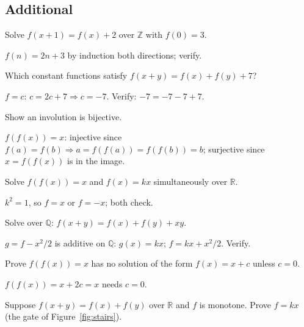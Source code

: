 \subsection*{Additional}
\begin{exercise}[easy]\label{exr:fa1}
Solve $f(x+1)=f(x)+2$ over $\mathbb Z$ with $f(0)=3$.
\end{exercise}
\begin{solution}
$f(n)=2n+3$ by induction both directions; verify.
\end{solution}
\begin{exercise}[easy]\label{exr:fa2}
Which constant functions satisfy $f(x+y)=f(x)+f(y)+7$?
\end{exercise}
\begin{solution}
$f=c$: $c=2c+7 \Rightarrow c=-7$. Verify: $-7=-7-7+7$.
\end{solution}
\begin{exercise}[easy]\label{exr:fa3}
Show an involution is bijective.
\end{exercise}
\begin{solution}
$f(f(x))=x$: injective since $f(a)=f(b)\Rightarrow a=f(f(a))=f(f(b))=b$;
surjective since $x=f(f(x))$ is in the image.
\end{solution}
\begin{exercise}[easy]\label{exr:fa4}
Solve $f(f(x))=x$ and $f(x)=kx$ simultaneously over $\mathbb R$.
\end{exercise}
\begin{solution}
$k^2=1$, so $f=x$ or $f=-x$; both check.
\end{solution}
\begin{exercise}[medium]\label{exr:fa5}
Solve over $\mathbb Q$: $f(x+y)=f(x)+f(y)+xy$.
\end{exercise}
\begin{solution}
$g=f-x^2/2$ is additive on $\mathbb Q$: $g(x)=kx$; $f=kx+x^2/2$. Verify.
\end{solution}
\begin{exercise}[medium]\label{exr:fa6}
Prove $f(f(x))=x$ has no solution of the form $f(x)=x+c$ unless $c=0$.
\end{exercise}
\begin{solution}
$f(f(x))=x+2c=x$ needs $c=0$.
\end{solution}
\begin{exercise}[medium]\label{exr:fa7}
Suppose $f(x+y)=f(x)+f(y)$ over $\mathbb R$ and $f$ is monotone. Prove
$f=kx$ (the gate of Figure~\ref{fig:stairs}).
\end{exercise}

